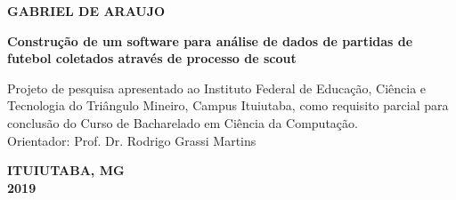 \newpage
\thispagestyle{empty}

\begin{center}
\textbf{GABRIEL DE ARAUJO}

\vspace*{3 cm}

\textbf{Construção de um software para análise de dados de partidas de futebol coletados através de processo de scout}
\end{center}

\vspace*{3 cm}

\hfill
\begin{minipage}{8cm}
Projeto de pesquisa apresentado ao Instituto Federal de Educação, Ciência e Tecnologia do Triângulo Mineiro, Campus Ituiutaba, como requisito parcial para conclusão do Curso de Bacharelado em Ciência da Computação.\\

Orientador: Prof. Dr. Rodrigo Grassi Martins\\
\end{minipage}

\vspace*{8.5 cm}

\begin{center}
\textbf{ITUIUTABA, MG\\2019}
\end{center}